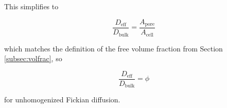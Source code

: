 This simplifies to

\begin{equation}
  \frac{D_\mathrm{eff}}{D_\mathrm{bulk}} = \frac{A_\mathrm{pore}}{A_\mathrm{cell}}
\end{equation}

which matches the definition of the free volume fraction from Section \ref{subsec:volfrac}, so

\begin{equation}
  \boxed{
    \frac{D_\mathrm{eff}}{D_\mathrm{bulk}} = \phi
  }
\end{equation}

for unhomogenized Fickian diffusion.
